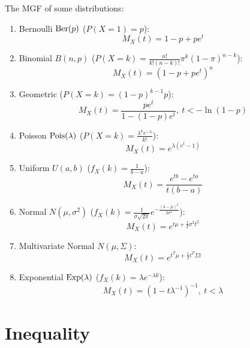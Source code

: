 \documentclass[11pt]{elegantbook}
\begin{document}
\begin{example}
    The MGF of some distributions:
    \begin{enumerate}
        \item Bernoulli $\textnormal{Ber}(p)$ ($P(X=1)=p$): $$M_X(t)=1-p+pe^t$$
        \item Binomial $B(n,p)$ ($P(X=k)=\frac{n!}{k!(n-k)!}\pi^k(1-\pi)^{n-k}$): $$M_X(t)=(1-p+pe^t)^n$$
        \item Geometric ($P(X=k)=(1-p)^{k-1}p$): $$M_X(t)=\frac{pe^t}{1-(1-p)e^t},\ t<-\ln(1-p)$$
        \item Poisson $\textnormal{Pois}(\lambda)$ ($P(X=k)=\frac{\lambda^ke^{-\lambda}}{k!}$): $$M_X(t)=e^{\lambda (e^t-1)}$$
        \item Uniform $U(a,b)$ ($f_X(k)=\frac{1}{b-a}$): $$M_X(t)=\frac{e^{tb}-e^{ta}}{t(b-a)}$$
        \item Normal $N(\mu,\sigma^2)$ ($f_X(k)=\frac{1}{\sigma\sqrt{2\pi}}e^{-\frac{(k-\mu)^2}{2\sigma^2}}$): $$M_X(t)=e^{t\mu+\frac{1}{2}\sigma^2 t^2}$$
        \item Multivariate Normal $N(\mu,\Sigma)$: $$M_X(t)=e^{t^T\mu+\frac{1}{2}t^T\Sigma t}$$
        \item Exponential $\textnormal{Exp}(\lambda)$ ($f_X(k)=\lambda e^{-\lambda k}$): $$M_X(t)=(1-t\lambda^{-1})^{-1},\ t<\lambda$$
    \end{enumerate}
\end{example}

\section{Inequality}
\end{document}

